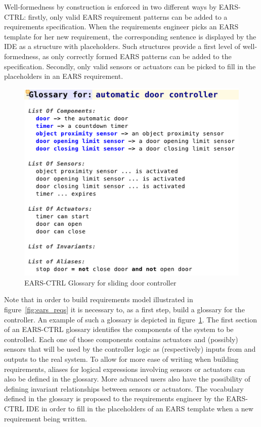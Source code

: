 Well-formedness by construction is enforced in two different ways by
\textsf{EARS-CTRL}: firstly, only valid EARS requirement patterns can be added
to a requirements specification. When the requirements engineer picks an EARS
template for her new requirement, the corresponding sentence is displayed by the
IDE as a structure with placeholders. Such structures provide a first level of
well-formedness, as only correctly formed EARS patterns can be added to the
specification. Secondly, only valid sensors or actuators can be picked to fill
in the placeholders in an EARS requirement.

\begin{figure}[h!]
   \begin{center}
     \includegraphics[width=.5\textwidth]{images/glossary.png}
     \caption{\textsf{EARS-CTRL} Glossary for sliding door
     controller}
     \label{fig:ears_glossary}
   \end{center}
 \end{figure}

Note that in order to build requirements model illustrated in
figure~\ref{fig:ears_reqs} it is necessary to, as a first step, build a glossary
for the controller. An example of such a glossary is depicted in
figure~\ref{fig:ears_glossary}. The first section of an \textsf{EARS-CTRL}
glossary identifies the components of the system to be controlled. Each one of
those components contains actuators and (possibly) sensors that will be used by
the controller logic as (respectively) inputs from and outputs to the real
system. To allow for more ease of writing when building requirements, aliases
for logical expressions involving sensors or actuators can also be defined in
the glossary. More advanced users also have the possibility of defining
invariant relationships between sensors or actuators.
The vocabulary defined in the glossary is proposed to the requirements engineer
by the \textsf{EARS-CTRL} IDE in order to fill in the placeholders of an EARS
template when a new requirement being written.

